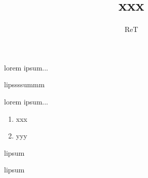 \documentclass[noheader, nomaketitle, nolistings]{brandeis-problemset}
\title{xxx}
\author{ReT}
\begin{document}
\maketitle

\tableofcontents

\begin{problem}
lorem ipsum...
\end{problem}

\begin{subproblem}
	lipssssummm
\end{subproblem}

\begin{problem}
lorem ipsum...
\begin{enumerate}
	\item xxx
	\item yyy
\end{enumerate}
\end{problem}

\begin{subproblem}
	lipsum
\end{subproblem}

\begin{subproblem}
	lipsum
\end{subproblem}
\end{document}
